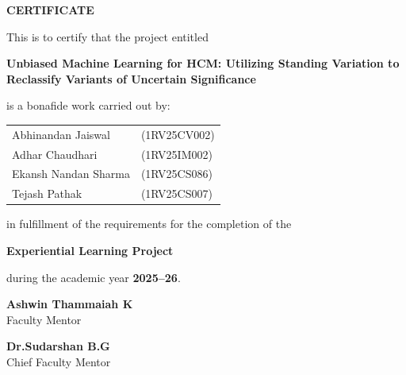 \documentclass[12pt,a4paper]{article}
\begin{document}

\newpage
\thispagestyle{empty}

\begin{center}
{\Huge\textbf{CERTIFICATE}}

\vspace{1.5cm}

This is to certify that the project entitled

\vspace{0.4cm}


{\Large\textbf{Unbiased Machine Learning for HCM: Utilizing Standing Variation to Reclassify Variants of Uncertain Significance}}

\vspace{0.8cm}

is a bonafide work carried out by:

\vspace{0.5cm}

\begin{tabular}{ll}
Abhinandan Jaiswal    & (1RV25CV002) \\
Adhar Chaudhari     & (1RV25IM002) \\
Ekansh Nandan Sharma  & (1RV25CS086) \\
Tejash Pathak & (1RV25CS007) \\
\end{tabular}

\vspace{0.8cm}

in fulfillment of the requirements for the completion of the

\textbf{Experiential Learning Project}

during the academic year \textbf{2025--26}.

\end{center}

\vspace{2cm}

\noindent
\begin{minipage}{0.45\textwidth}
\textbf{Ashwin Thammaiah K}\\
Faculty Mentor
\end{minipage}
\hfill
\begin{minipage}{0.45\textwidth}
\raggedleft
\textbf{Dr.Sudarshan B.G}\\
Chief Faculty Mentor
\end{minipage}
\end{document}
